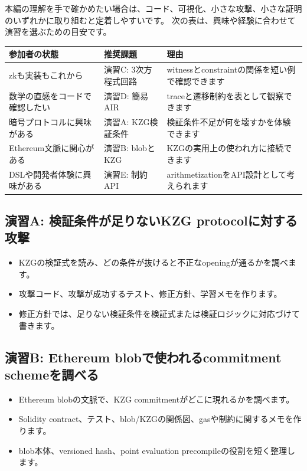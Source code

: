 \documentclass[a4paper,11pt]{ltjsarticle}
\begin{document}
本編の理解を手で確かめたい場合は、コード、可視化、小さな攻撃、小さな証明のいずれかに取り組むと定着しやすいです。
次の表は、興味や経験に合わせて演習を選ぶための目安です。

\begin{center}
\begin{tabularx}{\linewidth}{@{}lYY@{}}
\toprule
参加者の状態 & 推奨課題 & 理由 \\
\midrule
zkも実装もこれから & 演習C: 3次方程式回路 & witnessとconstraintの関係を短い例で確認できます \\
数学の直感をコードで確認したい & 演習D: 簡易AIR & traceと遷移制約を表として観察できます \\
暗号プロトコルに興味がある & 演習A: KZG検証条件 & 検証条件不足が何を壊すかを体験できます \\
Ethereum文脈に関心がある & 演習B: blobとKZG & KZGの実用上の使われ方に接続できます \\
DSLや開発者体験に興味がある & 演習E: 制約API & arithmetizationをAPI設計として考えられます \\
\bottomrule
\end{tabularx}
\end{center}

\subsection{演習A: 検証条件が足りないKZG protocolに対する攻撃}

\begin{itemize}
  \item KZGの検証式を読み、どの条件が抜けると不正なopeningが通るかを調べます。
  \item 攻撃コード、攻撃が成功するテスト、修正方針、学習メモを作ります。
  \item 修正方針では、足りない検証条件を検証式または検証ロジックに対応づけて書きます。
\end{itemize}

\subsection{演習B: Ethereum blobで使われるcommitment schemeを調べる}

\begin{itemize}
  \item Ethereum blobの文脈で、KZG commitmentがどこに現れるかを調べます。
  \item Solidity contract、テスト、blob/KZGの関係図、gasや制約に関するメモを作ります。
  \item blob本体、versioned hash、point evaluation precompileの役割を短く整理します。
\end{itemize}
\end{document}
